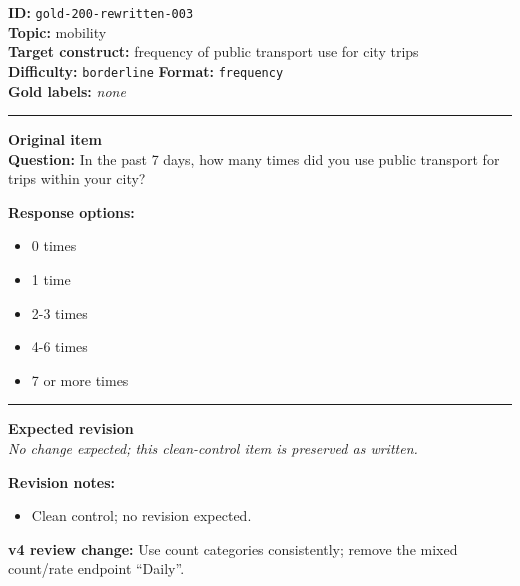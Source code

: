 \documentclass[10pt,a4paper]{article}
\newcommand{\sectionline}{\vspace{0.15em}\hrule\vspace{0.35em}}
\begin{document}
\begin{tcolorbox}[colframe=CleanGreen,colback=white,colbacktitle=CleanGreen!9,coltitle=black,title={Item 003\hfill Clean control}]
\textbf{ID:} \texttt{gold-200-rewritten-003}\\
\textbf{Topic:} mobility\\
\textbf{Target construct:} frequency of public transport use for city trips\\
\textbf{Difficulty:} \texttt{borderline} \quad \textbf{Format:} \texttt{frequency}\\
\textbf{Gold labels:} \textit{none}\\
\sectionline
\textbf{Original item}\\
\textbf{Question:} In the past 7 days, how many times did you use public transport for trips within your city?
\par\textbf{Response options:}
\begin{itemize}
\item 0 times
\item 1 time
\item 2-3 times
\item 4-6 times
\item 7 or more times
\end{itemize}
\sectionline
\textbf{Expected revision}\\
\textit{No change expected; this clean-control item is preserved as written.}
\par\textbf{Revision notes:}
\begin{itemize}
\item Clean control; no revision expected.
\end{itemize}
\par\textbf{v4 review change:} Use count categories consistently; remove the mixed count/rate endpoint ``Daily''.
\end{tcolorbox}
\end{document}
